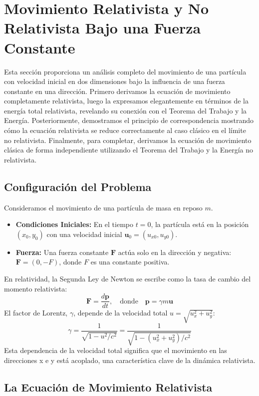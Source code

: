\documentclass[11pt,a4paper]{article}
\begin{document}
\section{Movimiento Relativista y No Relativista Bajo una Fuerza Constante}
Esta sección proporciona un análisis completo del movimiento de una partícula con velocidad inicial en dos dimensiones bajo la influencia de una fuerza constante en una dirección. Primero derivamos la ecuación de movimiento completamente relativista, luego la expresamos elegantemente en términos de la energía total relativista, revelando su conexión con el Teorema del Trabajo y la Energía. Posteriormente, demostramos el principio de correspondencia mostrando cómo la ecuación relativista se reduce correctamente al caso clásico en el límite no relativista. Finalmente, para completar, derivamos la ecuación de movimiento clásica de forma independiente utilizando el Teorema del Trabajo y la Energía no relativista.

\subsection{Configuración del Problema}
Consideramos el movimiento de una partícula de masa en reposo $m$.
\begin{itemize}
    \item \textbf{Condiciones Iniciales:} En el tiempo $t=0$, la partícula está en la posición $(x_0, y_0)$ con una velocidad inicial $\boldsymbol{u}_0 = (u_{x0}, u_{y0})$.
    \item \textbf{Fuerza:} Una fuerza constante $\boldsymbol{F}$ actúa solo en la dirección y negativa: $\boldsymbol{F} = (0, -F)$, donde $F$ es una constante positiva.
\end{itemize}
En relatividad, la Segunda Ley de Newton se escribe como la tasa de cambio del momento relativista:
\[ \boldsymbol{F} = \frac{d\boldsymbol{p}}{dt}, \quad \text{donde} \quad \boldsymbol{p} = \gamma m \boldsymbol{u} \]
El factor de Lorentz, $\gamma$, depende de la velocidad total $u = \sqrt{u_x^2 + u_y^2}$:
\[ \gamma = \frac{1}{\sqrt{1 - u^2/c^2}} = \frac{1}{\sqrt{1 - (u_x^2 + u_y^2)/c^2}} \]
Esta dependencia de la velocidad total significa que el movimiento en las direcciones x e y está acoplado, una característica clave de la dinámica relativista.

\subsection{La Ecuación de Movimiento Relativista}
\end{document}
